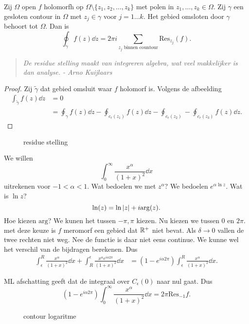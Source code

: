 \begin{stelling}
	Zij $\Omega$ open $f$ holomorfh op $\Omega \setminus \{ z_1, z_2, \ldots, z_k\} $ met polen in $z_1, \ldots, z_k \in \Omega$. 
	Zij $\gamma$ een gesloten contour in $\Omega$ met $z_j \in \gamma$ voor $j = 1 \ldots k$. 
	Het gebied omsloten door $\gamma$ behoort tot  $\Omega$. 
	Dan is \[
		\oint_\gamma f(z) \dd z  = 2\pi i \sum_{z_j \text{ binnen countour}} \text{Res}_{z_j}(f)
	.\] 
\end{stelling}
\begin{quote}
	\textit{De residue stelling maakt van integreren algebra, wat veel makkelijker is dan analyse. - Arno Kuijlaars}
\end{quote}
\begin{proof}
	Zij $\tilde \gamma$ dat gebied omsluit waar $f$ holomorf is. 
	Volgens de afbeelding
	\begin{align*}
		\int_{\tilde \gamma} f(z) \dd  z &= 0 \\
						 &= \oint_{\gamma}f(z)\dd z - \oint_{c_r(z_1)} f(z) \dd z - \oint_{c_r(z_2)} - \oint_{c_r(z_3)}f(z) \dd z
	.\end{align*}
\end{proof}
\begin{figure}[ht]
    \centering
    \caption{residue stelling}
    \label{fig:residue-stelling}
\end{figure}

\begin{vb}
	We willen \[
		\int_{0}^{\infty} \frac{x^{\alpha}}{(1 + x)^2} \dd x
	\] uitrekenen voor $-1 < \alpha < 1$.
	Wat bedoelen we met $z^{\alpha}$? We bedoelen $e^{\alpha \ln z}$. Wat is $\ln z$?
	 \[
		 \ln(z) = \ln \left| z \right| + i \mathrm{arg}(z)
	.\] 
	Hoe kiezen $\mathrm{arg}$? We kunen het tussen  $-\pi, \pi$ kiezen. Nu kiezen we tussen  $0 $ en $2\pi$.
	met deze keuze is  $f$ meromorf een gebied dat $\mathbb{R}^{+}$ niet bevat.
	Als $\delta \to 0$ vallen de twee rechten niet weg. Nee de functie is daar niet eens continue. We kunne wel het verschil van de bijdragen berekenen. 
	Dus 
	\begin{align*}
		\int_{\epsilon}^{R} \frac{x^{\alpha}}{(1 + x)^2} \dd x + \int_{R}^{\epsilon }\frac{x^{\alpha} e^{i\alpha 2 \pi }}{( 1 + x)^2} \dd x &= (1 - e^{i\alpha 2 \pi}) \int_{\epsilon}^{R} \frac{x^{\alpha}}{(1 + x)^2 } \dd x 
	.\end{align*}

	ML afschatting geeft dat de integraal over  $C_{\epsilon}(0)$ naar nul gaat.
	Dus \[
		(1 - e^{i \alpha 2 \pi}) \int_{0}^{\infty}\frac{x^{\alpha}}{(1 + x)^2} \dd x	 = 2 \pi \mathrm{Res}_{-1}f
	.\] 

\end{vb}
\begin{figure}[ht]
    \centering
    \caption{contour logaritme}
    \label{fig:contour-logaritme}
\end{figure}
